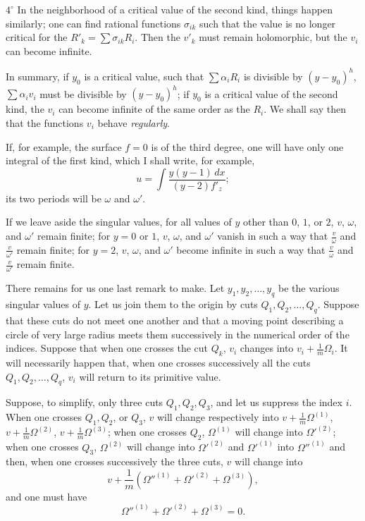 \documentclass{article}
\begin{document}
$4^\circ$ In the neighborhood of a critical value of the second kind, things happen similarly; one can find rational functions $\sigma_{ik}$ such that the value is no longer critical for the $\displaystyle R'_{k} = \sum \sigma_{ik} R_{i}$. Then the $v'_{k}$ must remain holomorphic, but the $v_{i}$ can become infinite.

In summary, if $y_{0}$ is a critical value, such that $\displaystyle\sum \alpha_{i} R_{i}$ is divisible by $(y - y_{0})^{h}$, $\displaystyle\sum \alpha_{i} v_{i}$ must be divisible by $(y - y_{0})^{h}$; if $y_{0}$ is a critical value of the second kind, the $v_{i}$ can become infinite of the same order as the $R_{i}$. We shall say then that the functions $v_{i}$ behave \emph{regularly}.

If, for example, the surface $f = 0$ is of the third degree, one will have only one integral of the first kind, which I shall write, for example,
\[
u = \int \frac{y(y-1)\,dx}{(y-2) f'_{z}};
\]
its two periods will be $\omega$ and $\omega'$.

If we leave aside the singular values, for all values of $y$ other than $0$, $1$, or $2$, $v$, $\omega$, and $\omega'$ remain finite; for $y = 0$ or $1$, $v$, $\omega$, and $\omega'$ vanish in such a way that $\frac{v}{\omega}$ and $\frac{v}{\omega'}$ remain finite; for $y = 2$, $v$, $\omega$, and $\omega'$ become infinite in such a way that $\frac{v}{\omega}$ and $\frac{v}{\omega'}$ remain finite.

There remains for us one last remark to make. Let $y_{1}, y_{2}, \ldots, y_{q}$ be the various singular values of $y$. Let us join them to the origin by cuts $Q_{1}, Q_{2}, \ldots, Q_{q}$. Suppose that these cuts do not meet one another and that a moving point describing a circle of very large radius meets them successively in the numerical order of the indices. Suppose that when one crosses the cut $Q_{k}$, $v_{i}$
changes into $v_{i} + \frac{1}{m} \Omega_{i}$. It will necessarily happen that, when one crosses successively all the cuts $Q_{1}, Q_{2}, \ldots, Q_{q}$, $v_{i}$ will return to its primitive value.

Suppose, to simplify, only three cuts $Q_{1}, Q_{2}, Q_{3}$, and let us suppress the index $i$. When one crosses $Q_{1}, Q_{2}$, or $Q_{3}$, $v$ will change respectively into $v + \frac{1}{m} \Omega^{(1)}$, $v + \frac{1}{m} \Omega^{(2)}$, $v + \frac{1}{m} \Omega^{(3)}$; when one crosses $Q_{2}$, $\Omega^{(1)}$ will change into $\Omega'^{(2)}$; when one crosses $Q_{3}$, $\Omega^{(2)}$ will change into $\Omega'^{(2)}$ and $\Omega'^{(1)}$ into $\Omega''^{(1)}$ and then, when one crosses successively the three cuts, $v$ will change into
\[
v + \frac{1}{m} (\Omega''^{(1)} + \Omega'^{(2)} + \Omega^{(3)}),
\]
and one must have
\[
\Omega''^{(1)} + \Omega'^{(2)} + \Omega^{(3)} = 0. \tag{4}
\]
\end{document}
